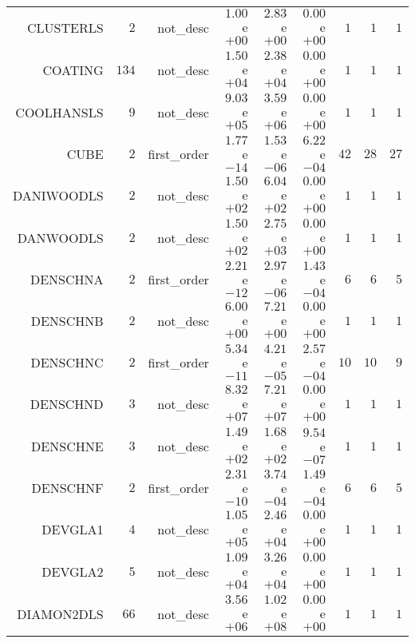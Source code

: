 \begin{longtable}{rrrrrrrrr}
CLUSTERLS & \(     2\) & not\_desc & \( 1.00\)e\(+00\) & \( 2.83\)e\(+00\) & \( 0.00\)e\(+00\) & \(     1\) & \(     1\) & \(     1\) \\
COATING & \(   134\) & not\_desc & \( 1.50\)e\(+04\) & \( 2.38\)e\(+04\) & \( 0.00\)e\(+00\) & \(     1\) & \(     1\) & \(     1\) \\
COOLHANSLS & \(     9\) & not\_desc & \( 9.03\)e\(+05\) & \( 3.59\)e\(+06\) & \( 0.00\)e\(+00\) & \(     1\) & \(     1\) & \(     1\) \\
CUBE & \(     2\) & first\_order & \( 1.77\)e\(-14\) & \( 1.53\)e\(-06\) & \( 6.22\)e\(-04\) & \(    42\) & \(    28\) & \(    27\) \\
DANIWOODLS & \(     2\) & not\_desc & \( 1.50\)e\(+02\) & \( 6.04\)e\(+02\) & \( 0.00\)e\(+00\) & \(     1\) & \(     1\) & \(     1\) \\
DANWOODLS & \(     2\) & not\_desc & \( 1.50\)e\(+02\) & \( 2.75\)e\(+03\) & \( 0.00\)e\(+00\) & \(     1\) & \(     1\) & \(     1\) \\
DENSCHNA & \(     2\) & first\_order & \( 2.21\)e\(-12\) & \( 2.97\)e\(-06\) & \( 1.43\)e\(-04\) & \(     6\) & \(     6\) & \(     5\) \\
DENSCHNB & \(     2\) & not\_desc & \( 6.00\)e\(+00\) & \( 7.21\)e\(+00\) & \( 0.00\)e\(+00\) & \(     1\) & \(     1\) & \(     1\) \\
DENSCHNC & \(     2\) & first\_order & \( 5.34\)e\(-11\) & \( 4.21\)e\(-05\) & \( 2.57\)e\(-04\) & \(    10\) & \(    10\) & \(     9\) \\
DENSCHND & \(     3\) & not\_desc & \( 8.32\)e\(+07\) & \( 7.21\)e\(+07\) & \( 0.00\)e\(+00\) & \(     1\) & \(     1\) & \(     1\) \\
DENSCHNE & \(     3\) & not\_desc & \( 1.49\)e\(+02\) & \( 1.68\)e\(+02\) & \( 9.54\)e\(-07\) & \(     1\) & \(     1\) & \(     1\) \\
DENSCHNF & \(     2\) & first\_order & \( 2.31\)e\(-10\) & \( 3.74\)e\(-04\) & \( 1.49\)e\(-04\) & \(     6\) & \(     6\) & \(     5\) \\
DEVGLA1 & \(     4\) & not\_desc & \( 1.05\)e\(+05\) & \( 2.46\)e\(+04\) & \( 0.00\)e\(+00\) & \(     1\) & \(     1\) & \(     1\) \\
DEVGLA2 & \(     5\) & not\_desc & \( 1.09\)e\(+04\) & \( 3.26\)e\(+04\) & \( 0.00\)e\(+00\) & \(     1\) & \(     1\) & \(     1\) \\
DIAMON2DLS & \(    66\) & not\_desc & \( 3.56\)e\(+06\) & \( 1.02\)e\(+08\) & \( 0.00\)e\(+00\) & \(     1\) & \(     1\) & \(     1\) \\

\end{longtable}
